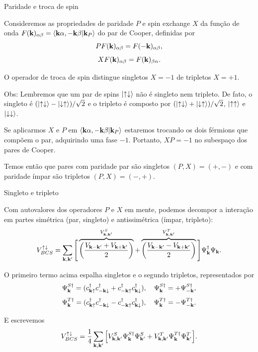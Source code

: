 \documentclass[aspectratio=169,xcolor={table,dvipsnames,usenames}]{beamer}
\begin{document}
\begin{frame}{Paridade e troca de spin}

Consideremos as propriedades de paridade $P$ e spin exchange $X$ da função de onda $F(\vb{k})_{\alpha\beta} = \braket{\vb{k}\alpha,-\vb{k}\beta}{\vb{k}_P}$ do par de Cooper, definidas por
$$
P F(\vb{k})_{\alpha\beta} = F(-\vb{k})_{\alpha\beta},
$$
$$
X F(\vb{k})_{\alpha\beta} = F(\vb{k})_{\beta\alpha}.
$$

O operador de troca de spin distingue singletos $X = -1$ de tripletos $X = +1$.

\n

Obs: Lembremos que um par de spins $\ket{\uparrow\downarrow}$ não é singleto nem tripleto. De fato, o singleto é $(\ket{\uparrow\downarrow} - \ket{\downarrow\uparrow})/\sqrt{2}$ e o tripleto é composto por $(\ket{\uparrow\downarrow} + \ket{\downarrow\uparrow})/\sqrt{2}$, $\ket{\uparrow\uparrow}$ e $\ket{\downarrow\downarrow}$.

\n

Se aplicarmos $X$ e $P$ em $\braket{\vb{k}\alpha,-\vb{k}\beta}{\vb{k}_P}$ estaremos trocando os dois férmions que compõem o par, adquirindo uma fase $-1$. Portanto, $XP = -1$ no subespaço dos pares de Cooper.

\n

Temos então que pares com paridade par são singletos $(P,X) = (+, -)$ e com paridade ímpar são tripletos $(P,X) = (-,+)$.

\end{frame}

\begin{frame}{Singleto e tripleto}

Com autovalores dos operadores $P$ e $X$ em mente, podemos decompor a interação em partes simétrica (par, singleto) e antissimétrica (ímpar, tripleto):
$$
V_{BCS}^{\uparrow\downarrow} = \sum_{\vb{k},\vb{k}'}
\Bigg[
\overbrace{\qty(\frac{V_{\vb{k}-\vb{k}'} + V_{\vb{k}+\vb{k}'}}{2})}^{V_{\vb{k},\vb{k}'}^S} +
\overbrace{\qty(\frac{V_{\vb{k}-\vb{k}'} - V_{\vb{k}+\vb{k}'}}{2})}^{V_{\vb{k},\vb{k}'}^T}
\Bigg] \Psi_{\vb{k}}^\dagger \Psi_{\vb{k}}.
$$

O primeiro termo acima espalha singletos e o segundo tripletos, representados por
$$
\Psi_{\vb{k}}^{S\dagger} = (c_{\vb{k}\uparrow}^\dagger c_{-\vb{k}\downarrow}^\dagger + c_{-\vb{k}\uparrow}^\dagger c_{\vb{k}\downarrow}^\dagger),
\quad \Psi_{\vb{k}}^{S\dagger} = +\Psi_{-\vb{k}}^{S\dagger},
$$
$$
\Psi_{\vb{k}}^{T\dagger} = (c_{\vb{k}\uparrow}^\dagger c_{-\vb{k}\downarrow}^\dagger - c_{-\vb{k}\uparrow}^\dagger c_{\vb{k}\downarrow}^\dagger),
\quad \Psi_{\vb{k}}^{T\dagger} = -\Psi_{-\vb{k}}^{T\dagger}.
$$

E escrevemos
$$
V_{BCS}^{\uparrow\downarrow} =
\frac{1}{4} \sum_{\vb{k},\vb{k}'}
\qty[
V_{\vb{k},\vb{k}'}^S \Psi_{\vb{k}}^{S\dagger} \Psi_{\vb{k}'}^{S} +
V_{\vb{k},\vb{k}'}^T \Psi_{\vb{k}}^{T\dagger} \Psi_{\vb{k}'}^{T}
].
$$

\end{frame}
\end{document}
